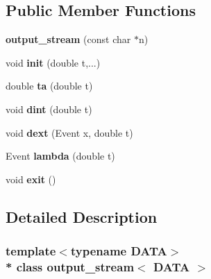 \subsection*{Public Member Functions}
\begin{DoxyCompactItemize}
\item 
{\bfseries output\+\_\+stream} (const char $\ast$n)\hypertarget{classoutput__stream_a7f886e28fa127c83d740a1460201989f}{}\label{classoutput__stream_a7f886e28fa127c83d740a1460201989f}

\item 
void {\bfseries init} (double t,...)\hypertarget{classoutput__stream_a2e26da84f458d7f2dd4a4ae6c3ef7c04}{}\label{classoutput__stream_a2e26da84f458d7f2dd4a4ae6c3ef7c04}

\item 
double {\bfseries ta} (double t)\hypertarget{classoutput__stream_ae304fdfee60d5aa1a69035236911e569}{}\label{classoutput__stream_ae304fdfee60d5aa1a69035236911e569}

\item 
void {\bfseries dint} (double t)\hypertarget{classoutput__stream_a566afa2f41b8e37e2d5a20e98dd7756f}{}\label{classoutput__stream_a566afa2f41b8e37e2d5a20e98dd7756f}

\item 
void {\bfseries dext} (Event x, double t)\hypertarget{classoutput__stream_ac00feadae41dc26511742d557e502864}{}\label{classoutput__stream_ac00feadae41dc26511742d557e502864}

\item 
Event {\bfseries lambda} (double t)\hypertarget{classoutput__stream_a5136f3bb17d67bb82266d0c5ec092a41}{}\label{classoutput__stream_a5136f3bb17d67bb82266d0c5ec092a41}

\item 
void {\bfseries exit} ()\hypertarget{classoutput__stream_a190253159ea0776ff7436e7a729253fd}{}\label{classoutput__stream_a190253159ea0776ff7436e7a729253fd}

\end{DoxyCompactItemize}


\subsection{Detailed Description}
\subsubsection*{template$<$typename D\+A\+TA$>$\\*
class output\+\_\+stream$<$ D\+A\+T\+A $>$}


